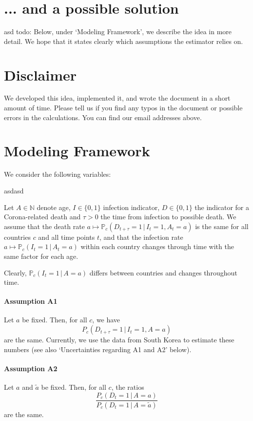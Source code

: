 \documentclass[a4paper]{article}
\newcommand\N{\mathbb{N}}
\newcommand\todo[1]{{\color{red}todo: #1}}
\renewcommand\P{\mathbb{P}}
\newcommand{\given}{\, \vert \,}
\begin{document}
\section{... and a possible solution}
asd \todo{}
Below, under `Modeling Framework', we describe the idea in more detail. 
We hope that it states
clearly which assumptions the estimator
relies on.


\section{Disclaimer}
We 
developed this idea, implemented it, and 
wrote the 
document in a short amount of time. Please tell us if you find any typos 
in the document or possible errors in 
the calculations. You can find our email addresses above.


\section{Modeling Framework}
We consider the following variables: 
\begin{compactitem}
\item asdasd
\end{compactitem}
Let $A \in \N$ denote age, $I \in \{0,1\}$ infection indicator, $D \in \{0,1\}$ the indicator for a Corona-related death and $\tau > 0$
the time from infection to possible death. We assume that the death rate $a \mapsto \P_c(D_{t+\tau} = 1 \given I_t = 1, A_t = a)$ is 
the same for all countries $c$ and all time points $t$, and that the infection rate $a \mapsto \P_c(I_{t} = 1 \given A_t = a)$ within 
each country changes through time with the same factor for each age.


Clearly, $\P_c(I_{t} = 1 \given A = a)$
differs between countries and changes throughout time.

\paragraph{Assumption A1} Let $a$ be fixed. Then, for all $c$, we have
\begin{equation}
P_c(D_{t+\tau} = 1\,|\,I_t = 1, A = a)
\end{equation}
are the same. 
Currently, we use the data from South Korea to 
estimate these numbers (see also `Uncertainties regarding A1 and A2' below). 



\paragraph{Assumption A2} Let $a$ and $\tilde{a}$ be fixed. Then, for all $c$, the ratios 
\begin{equation}
\frac{P_c(D_t = 1\,|\,A = a)}{P_c(D_t = 1\,|\,A = \tilde{a})}
\end{equation}
are the same. 
\end{document}
